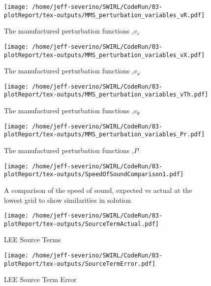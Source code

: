 \documentclass[a4paper]{article}
\begin{document}
\begin{figure}[!]
    \centering
    \texttt{[image: /home/jeff-severino/SWIRL/CodeRun/03-plotReport/tex-outputs/MMS\_perturbation\_variables\_vR.pdf]}
\caption{The manufactured perturbation functions ,$v_r$}%
    \label{fig:1a}
\end{figure}


\begin{figure}[!]
    \centering
    \texttt{[image: /home/jeff-severino/SWIRL/CodeRun/03-plotReport/tex-outputs/MMS\_perturbation\_variables\_vX.pdf]}
\caption{The manufactured perturbation functions ,$v_x$}%
    \label{fig:1a}
\end{figure}


\begin{figure}[!]
    \centering
    \texttt{[image: /home/jeff-severino/SWIRL/CodeRun/03-plotReport/tex-outputs/MMS\_perturbation\_variables\_vTh.pdf]}
    \caption{The manufactured perturbation functions ,$v_{\theta}$}%
    \label{fig:1a}
\end{figure}


\begin{figure}[!]
    \centering
    \texttt{[image: /home/jeff-severino/SWIRL/CodeRun/03-plotReport/tex-outputs/MMS\_perturbation\_variables\_Pr.pdf]}
\caption{The manufactured perturbation functions ,$P$}%
    \label{fig:1a}
\end{figure}

\begin{figure}[!]
    \centering
    \texttt{[image: /home/jeff-severino/SWIRL/CodeRun/03-plotReport/tex-outputs/SpeedOfSoundComparison1.pdf]}
    \caption{ A comparison of the speed of sound, expected vs actual at the lowest grid to show similarities in solution}
    \label{fig:2}
\end{figure}



\begin{figure}[!]
    \centering
    \texttt{[image: /home/jeff-severino/SWIRL/CodeRun/03-plotReport/tex-outputs/SourceTermActual.pdf]}
    \caption{LEE Source Terms}
    \label{fig:3}
\end{figure}


\begin{figure}[!]
    \centering
    \texttt{[image: /home/jeff-severino/SWIRL/CodeRun/03-plotReport/tex-outputs/SourceTermError.pdf]}
    \caption{LEE Source Term Error}
    \label{fig:3}
\end{figure}
\end{document}

